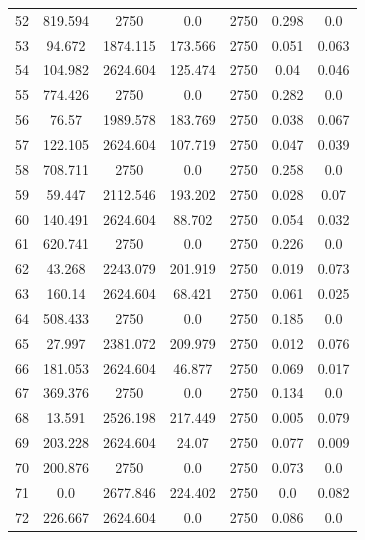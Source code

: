 \documentclass[]{article}
\begin{document}
\begin{longtable}{lcccccc}
		52 & 819.594 & 2750 & 0.0 & 2750 & 0.298 & 0.0           \\
		53 & 94.672 & 1874.115 & 173.566 & 2750 & 0.051 & 0.063  \\
		54 & 104.982 & 2624.604 & 125.474 & 2750 & 0.04 & 0.046  \\
		55 & 774.426 & 2750 & 0.0 & 2750 & 0.282 & 0.0           \\
		56 & 76.57 & 1989.578 & 183.769 & 2750 & 0.038 & 0.067   \\
		57 & 122.105 & 2624.604 & 107.719 & 2750 & 0.047 & 0.039 \\
		58 & 708.711 & 2750 & 0.0 & 2750 & 0.258 & 0.0           \\
		59 & 59.447 & 2112.546 & 193.202 & 2750 & 0.028 & 0.07   \\
		60 & 140.491 & 2624.604 & 88.702 & 2750 & 0.054 & 0.032  \\
		61 & 620.741 & 2750 & 0.0 & 2750 & 0.226 & 0.0           \\
		62 & 43.268 & 2243.079 & 201.919 & 2750 & 0.019 & 0.073  \\
		63 & 160.14 & 2624.604 & 68.421 & 2750 & 0.061 & 0.025   \\
		64 & 508.433 & 2750 & 0.0 & 2750 & 0.185 & 0.0           \\
		65 & 27.997 & 2381.072 & 209.979 & 2750 & 0.012 & 0.076  \\
		66 & 181.053 & 2624.604 & 46.877 & 2750 & 0.069 & 0.017 \\
		67 & 369.376 & 2750 & 0.0 & 2750 & 0.134 & 0.0           \\
		68 & 13.591 & 2526.198 & 217.449 & 2750 & 0.005 & 0.079  \\
		69 & 203.228 & 2624.604 & 24.07 & 2750 & 0.077 & 0.009   \\
		70 & 200.876 & 2750 & 0.0 & 2750 & 0.073 & 0.0           \\
		71 & 0.0 & 2677.846 & 224.402 & 2750 & 0.0 & 0.082       \\
		72 & 226.667 & 2624.604 & 0.0 & 2750 & 0.086 & 0.0       \\

\end{longtable}

\captionsetup[subfigure]{font=small, labelfont=bf, skip=2pt, justification=centering}
\setlength{\intextsep}{6pt}
\setlength{\floatsep}{6pt}
\end{document}
